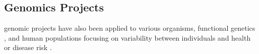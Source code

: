 

\subsection{Genomics Projects}
\Gls{genomic} projects have also been applied to various organisms, functional genetics \citep{ENCODE2004, FANTOM2001}, and human populations focusing on variability between individuals and health or disease risk \citep{HapMap2003, 1000Genomes2010}.
%
%
